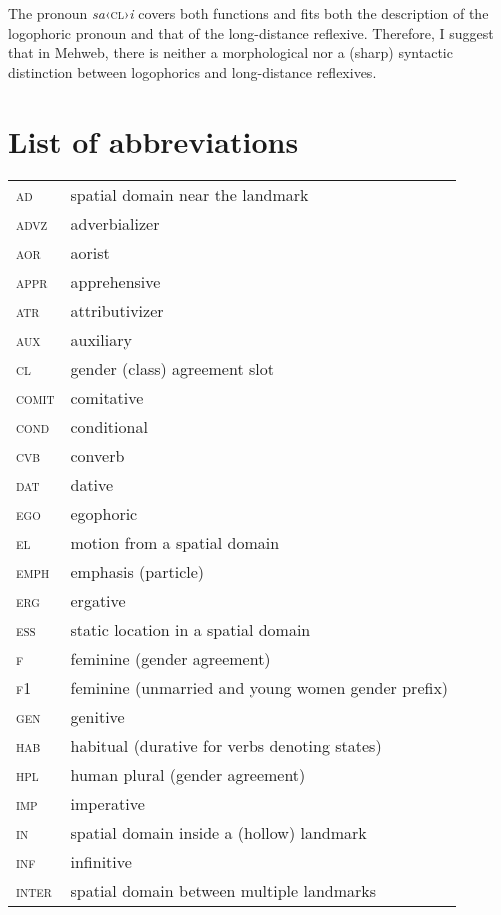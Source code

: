 ﻿\documentclass[output=paper]{langsci/langscibook}
\begin{document}
The pronoun \emph{sa}‹\textsc{cl}›\emph{i} covers both functions and
fits both the description of the logophoric pronoun and that of the
long-distance reflexive. Therefore, I suggest that in Mehweb, there is
neither a morphological nor a (sharp) syntactic distinction between
logophorics and long-distance reflexives.

\section*{List of abbreviations}

\begin{longtable}[l]{@{}ll@{}}
\textsc{ad}	& spatial domain near the landmark \\
\textsc{advz}	& adverbializer \\
\textsc{aor}	& aorist \\
\textsc{appr}	& apprehensive \\
\textsc{atr}	& attributivizer \\
\textsc{aux}	& auxiliary \\
\textsc{cl}	& gender (class) agreement slot \\
\textsc{comit}	& comitative \\
\textsc{cond}	& conditional \\
\textsc{cvb}	& converb \\
\textsc{dat}	& dative \\
\textsc{ego}	& egophoric \\
\textsc{el}	& motion from a spatial domain \\
\textsc{emph}	& emphasis (particle) \\
\textsc{erg}	& ergative \\
\textsc{ess}	& static location in a spatial domain \\
\textsc{f}	& feminine (gender agreement) \\
\textsc{f1}	& feminine (unmarried and young women gender prefix) \\
\textsc{gen}	& genitive \\
\textsc{hab}	& habitual (durative for verbs denoting states) \\
\textsc{hpl}	& human plural (gender agreement) \\
\textsc{imp}	& imperative \\
\textsc{in}	& spatial domain inside a (hollow) landmark \\
\textsc{inf}	& infinitive \\
\textsc{inter}	& spatial domain between multiple landmarks \\

\end{longtable}
\end{document}
